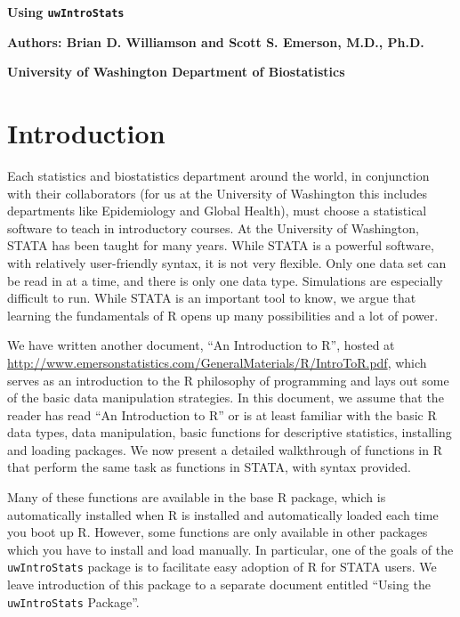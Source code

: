 \documentclass[landscape]{article}
\begin{document}

\centerline{\large{\textbf{Using \texttt{uwIntroStats}}}}
\centerline{\textbf{Authors: Brian D. Williamson and Scott S. Emerson, M.D., Ph.D.}}
\centerline{\textbf{University of Washington Department of Biostatistics}}
\tableofcontents
\newpage

\section{Introduction}
Each statistics and biostatistics department around the world, in conjunction with their collaborators (for us at the University of Washington this includes departments like Epidemiology and Global Health), must choose a statistical software to teach in introductory courses. At the University of Washington, STATA has been taught for many years. While STATA is a powerful software, with relatively user-friendly syntax, it is not very flexible. Only one data set can be read in at a time, and there is only one data type. Simulations are especially difficult to run. While STATA is an important tool to know, we argue that learning the fundamentals of R opens up many possibilities and a lot of power. 

We have written another document, ``An Introduction to R'', hosted at \url{http://www.emersonstatistics.com/GeneralMaterials/R/IntroToR.pdf}, which serves as an introduction to the R philosophy of programming and lays out some of the basic data manipulation strategies. In this document, we assume that the reader has read ``An Introduction to R'' or is at least familiar with the basic R data types, data manipulation, basic functions for descriptive statistics, installing and loading packages. We now present a detailed walkthrough of functions in R that perform the same task as functions in STATA, with syntax provided. 

Many of these functions are available in the base R package, which is automatically installed when R is installed and automatically loaded each time you boot up R. However, some functions are only available in other packages which you have to install and load manually. In particular, one of the goals of the \texttt{uwIntroStats} package is to facilitate easy adoption of R for STATA users. We leave introduction of this package to a separate document entitled ``Using the \texttt{uwIntroStats} Package''.
\end{document}
